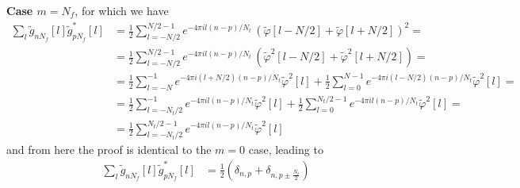 \documentclass[twocolumn,preprintnumbers,
  superscriptaddress,
  nofootinbib,
  amsmath,
  amssymb,
  aps,
  prd,
  colorlinks=true,
  linkcolor=blue,
  urlcolor=blue,
  citecolor=blue,
  anchorcolor=blue
]{revtex4-2}
\begin{document}
\textbf{Case $m=N_f$}, for which we have
%
\begin{align}
\sum_{l}\tilde{g}_{n N_f}[l]\tilde{g}_{p N_f}^*[l]&=\frac{1}{2}\sum_{l=-N/2}^{N/2-1} e^{-4\pi i l (n-p)/N_t}\, \left(\tilde{\varphi}[l-N/2]+\tilde{\varphi}[l+N/2]\right)^2=\nonumber\\
&=\frac{1}{2}\sum_{l=-N/2}^{N/2-1} e^{-4\pi i l (n-p)/N_t}\, \left(\tilde{\varphi}^2[l-N/2]+\tilde{\varphi}^2[l+N/2]\right)=\nonumber\\
&=\frac{1}{2}\sum_{l=-N}^{-1} e^{-4\pi i (l+N/2)(n-p)/N_t}\tilde{\varphi}^2[l]+\frac{1}{2}\sum_{l=0}^{N-1} e^{-4\pi i (l-N/2)(n-p)/N_t}\tilde{\varphi}^2[l]=\nonumber\\
&=\frac{1}{2}\sum_{l=-N_t/2}^{-1} e^{-4\pi i l(n-p)/N_t}\tilde{\varphi}^2[l]+\frac{1}{2}\sum_{l=0}^{N_t/2-1} e^{-4\pi i l(n-p)/N_t}\tilde{\varphi}^2[l]=\nonumber\\
&=\frac{1}{2}\sum_{l=-N_t/2}^{N_t/2-1} e^{-4\pi i l(n-p)/N_t}\tilde{\varphi}^2[l]
\end{align}
%
and from here the proof is identical to the $m=0$ case, leading to
%
\begin{align}
\sum_{l}\tilde{g}_{nN_f}[l]\tilde{g}_{pN_f}^*[l]&=\frac{1}{2}\left(\delta_{n,p}+\delta_{n,p\pm \frac{N_t}{2}}\right)
\end{align}
\end{document}
